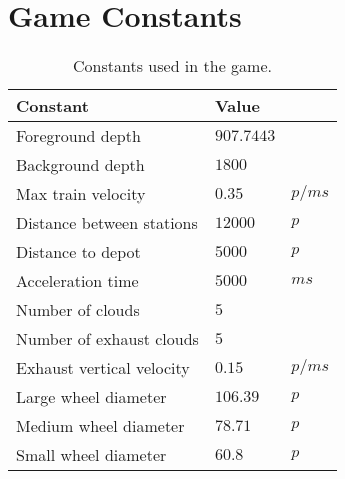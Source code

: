 \chapter{Game Constants}

\begin{table}[H]
\centering
\begin{tabular}{| l | l l |}
\hline
\textbf{Constant} & \textbf{Value} & \\
\hline
Foreground depth & $907.7443$ &\\
Background depth & $1800$ &\\
Max train velocity & $0.35$ & $p/ms$\\
Distance between stations & $12000$ & $p$\\
Distance to depot & $5000$ & $p$\\
Acceleration time & $5000$ & $ms$\\
Number of clouds & $5$ &\\
Number of exhaust clouds & $5$ &\\
Exhaust vertical velocity & $0.15$ & $p/ms$\\
Large wheel diameter & $106.39$ & $p$\\
Medium wheel diameter & $78.71$ & $p$\\
Small wheel diameter & $60.8$ & $p$\\
\hline
\end{tabular}
\label{tab:constants}
\caption{Constants used in the game.}
\end{table}
